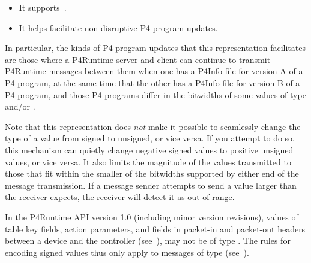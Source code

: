 \documentclass[11pt]{article}
\begin{document}
{\begin{itemize}
\item{}
It supports~.%

\item{}
It helps facilitate non-disruptive P4 program updates.%
\end{itemize}%

\noindent{}In particular, the kinds of P4 program updates that this representation
facilitates are those where a P4Runtime server and client can continue to
transmit P4Runtime messages between them when one has a P4Info file for version
A of a P4 program, at the same time that the other has a P4Info file for version
B of a P4 program, and those P4 programs differ in the bitwidths of some values
of type  and/or .%

Note that this representation does \emph{not} make it possible to seamlessly change
the type of a value from signed to unsigned, or vice versa.  If you attempt to
do so, this mechanism can quietly change negative signed values to positive
unsigned values, or vice versa.  It also limits the magnitude of the values
transmitted to those that fit within the smaller of the bitwidths supported by
either end of the message transmission.  If a message sender attempts to send a
value larger than the receiver expects, the receiver will detect it as out of
range.%

In the P4Runtime API version 1.0 (including minor version revisions), values
of table key fields, action parameters, and fields in packet-in and packet-out
headers between a device and the controller (see~),
may not be of type . The rules for encoding signed values thus only
apply to messages of type  (see~).%

}
\end{document}
